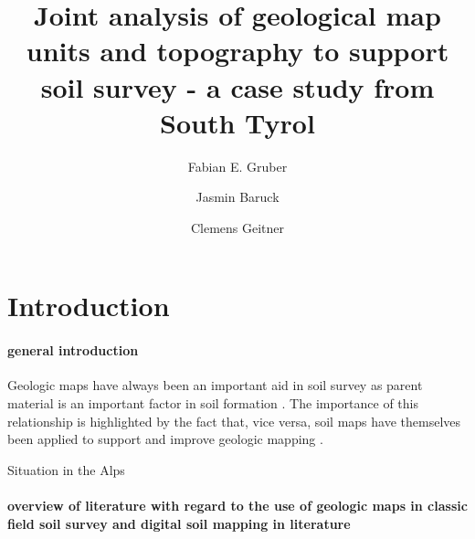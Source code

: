 \documentclass[preprint,12pt,authoryear]{elsarticle}
\begin{document}
\begin{frontmatter}

\title{Joint analysis of geological map units and topography to support soil survey - a case study from South Tyrol}


\author{Fabian E. Gruber}
\author{Jasmin Baruck}
\author{Clemens Geitner}

\address{University of Innsbruck}

\begin{abstract}

\end{abstract}

\begin{keyword}

\end{keyword}

\end{frontmatter}

\linenumbers

\section{Introduction}
\paragraph{general introduction}
Geologic maps have always been an important aid in soil survey as parent material is an important factor in soil formation \citep{Jenny1941}. The importance of this relationship is highlighted by the fact that, vice versa, soil maps have themselves been applied to support and improve geologic mapping \citep{Brevik2015}. 

Situation in the Alps

\paragraph{overview of literature with regard to the use of geologic maps in classic field soil survey and digital soil mapping in literature}
\end{document}
